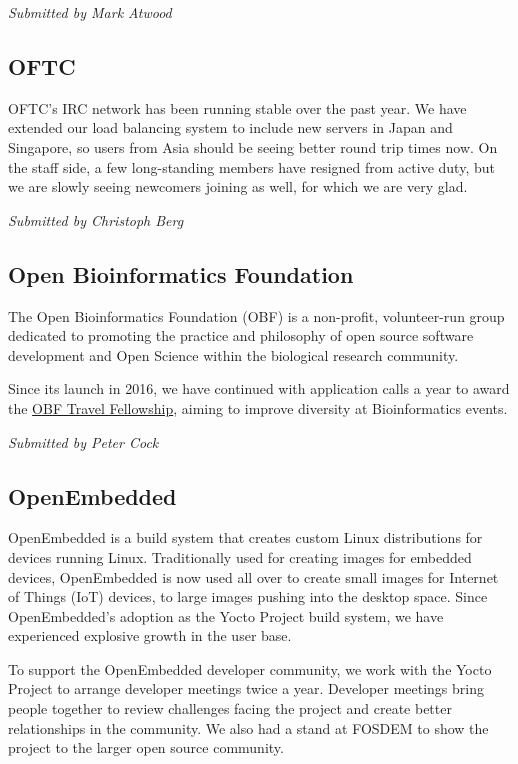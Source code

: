 \documentclass[a4paper]{report}
\begin{document}
{\em Submitted by Mark Atwood}

\subsection{OFTC}

OFTC's IRC network has been running stable over the past year. We have
extended our load balancing system to include new servers in Japan and
Singapore, so users from Asia should be seeing better round trip times
now. On the staff side, a few long-standing members have resigned from
active duty, but we are slowly seeing newcomers joining as well, for
which we are very glad.

{\em Submitted by Christoph Berg}

\subsection{Open Bioinformatics Foundation}

The Open Bioinformatics Foundation (OBF) is a non-profit, volunteer-run
group dedicated to promoting the practice and philosophy of open source
software development and Open Science within the biological research
community.

Since its launch in 2016, we have continued with application calls a
year to award the
\href{https://news.open-bio.org/2016/03/01/obf-travel-fellowship-program/}{OBF
Travel Fellowship}, aiming to improve diversity at Bioinformatics
events.

{\em Submitted by Peter Cock}

\subsection{OpenEmbedded}

OpenEmbedded is a build system that creates custom Linux distributions
for devices running Linux. Traditionally used for creating images for
embedded devices, OpenEmbedded is now used all over to create small
images for Internet of Things (IoT) devices, to large images pushing
into the desktop space.  Since OpenEmbedded's adoption as the Yocto
Project build system, we have experienced explosive growth in the user
base.

To support the OpenEmbedded developer community, we work with the Yocto
Project to arrange developer meetings twice a year. Developer meetings
bring people together to review challenges facing the project and create
better relationships in the community. We also had a stand at FOSDEM to
show the project to the larger open source community.
\end{document}
